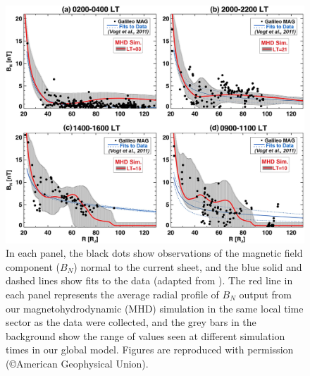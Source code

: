 \begin{figure}
    \centering
    \includegraphics[width=\textwidth]{images2/comparison-magneticfield.jpg}
    \caption{In each panel, the black dots show observations of the magnetic field component ($B_N$) normal to the current sheet, and the blue solid and dashed lines show fits to the data (adapted from \protect{}). The red line in each panel represents the average radial profile of $B_N$ output from our magnetohydrodynamic (MHD) simulation in the same local time sector as the data were collected, and the grey bars in the background show the range of values seen at different simulation times in our global model. Figures are reproduced with permission (\copyright American Geophysical Union).}
    \label{fig:comparison-magneticfield}
\end{figure}

